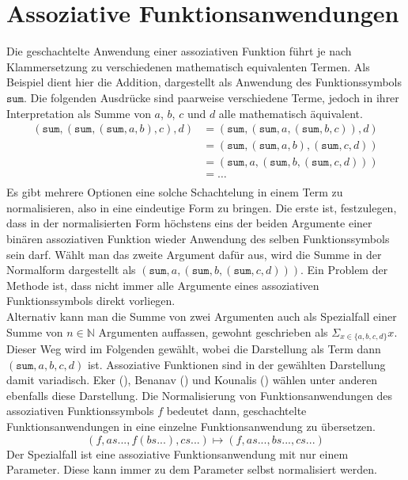 \section {Assoziative Funktionsanwendungen}
Die geschachtelte Anwendung einer assoziativen Funktion führt je nach Klammersetzung zu verschiedenen mathematisch equivalenten Termen. Als Beispiel dient hier die Addition, dargestellt als Anwendung des Funktionssymbols $\texttt{sum}$. Die folgenden Ausdrücke sind paarweise verschiedene Terme, jedoch in ihrer Interpretation als Summe von $a$, $b$, $c$ und $d$ alle mathematisch äquivalent.
\begin{equation*}
	\begin{split}
	   (\texttt{sum}, (\texttt{sum}, (\texttt{sum}, a, b), c), d) 
    &= (\texttt{sum}, (\texttt{sum}, a, (\texttt{sum}, b, c)), d)\\
	&= (\texttt{sum}, (\texttt{sum}, a, b), (\texttt{sum}, c, d))\\
	&= (\texttt{sum}, a, (\texttt{sum}, b, (\texttt{sum}, c, d)))\\
	&= \dots \\
	\end{split}
\end{equation*}
Es gibt mehrere Optionen eine solche Schachtelung in einem Term zu normalisieren, also in eine eindeutige Form zu bringen. Die erste ist, festzulegen, dass in der normalisierten Form höchstens eins der beiden Argumente einer binären assoziativen Funktion wieder Anwendung des selben Funktionssymbols sein darf. Wählt man das zweite Argument dafür aus, wird die Summe in der Normalform dargestellt als $(\texttt{sum}, a, (\texttt{sum}, b, (\texttt{sum}, c, d)))$. Ein Problem der Methode ist, dass nicht immer alle Argumente eines assoziativen Funktionssymbols direkt vorliegen.\\
Alternativ kann man die Summe von zwei Argumenten auch als Spezialfall einer Summe von $n \in \mathbb{N}$ Argumenten auffassen, gewohnt geschrieben als $\Sigma_{x \in \{a, b, c, d\}} x$. Dieser Weg wird im Folgenden gewählt, wobei die Darstellung als Term dann $(\texttt{sum}, a, b, c, d)$ ist. Assoziative Funktionen sind in der gewählten Darstellung damit variadisch. Eker (\cite{BipartiteGraphMatching}), Benanav (\cite{NPHardMatching}) und Kounalis (\cite{ACPatternCompiler}) wählen unter anderen ebenfalls diese Darstellung. 
Die Normalisierung von Funktionsanwendungen des assoziativen Funktionssymbols $f$ bedeutet dann, geschachtelte Funktionsanwendungen in eine einzelne Funktionsanwendung zu übersetzen. 
$$(f, as..., f(bs...), cs...) \mapsto (f, as..., bs..., cs...)$$
Der Spezialfall ist eine assoziative Funktionsanwendung mit nur einem Parameter. Diese kann immer zu dem Parameter selbst normalisiert werden. 


